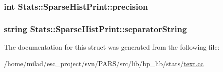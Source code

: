 \label{structStats_1_1SparseHistPrint_ab767d5886007c432b86a42171f7e1206}
\hypertarget{structStats_1_1SparseHistPrint_a3d11c791cb60284686ed2458773cc52f}{
\subsubsection[{precision}]{\setlength{\rightskip}{0pt plus 5cm}int {\bf Stats::SparseHistPrint::precision}}}
\label{structStats_1_1SparseHistPrint_a3d11c791cb60284686ed2458773cc52f}
\hypertarget{structStats_1_1SparseHistPrint_a72260b9f02d5395232d733329fc6c427}{
\subsubsection[{separatorString}]{\setlength{\rightskip}{0pt plus 5cm}string {\bf Stats::SparseHistPrint::separatorString}}}
\label{structStats_1_1SparseHistPrint_a72260b9f02d5395232d733329fc6c427}


The documentation for this struct was generated from the following file:\begin{DoxyCompactItemize}
\item 
/home/milad/esc\_\-project/svn/PARS/src/lib/bp\_\-lib/stats/\hyperlink{text_8cc}{text.cc}\end{DoxyCompactItemize}
